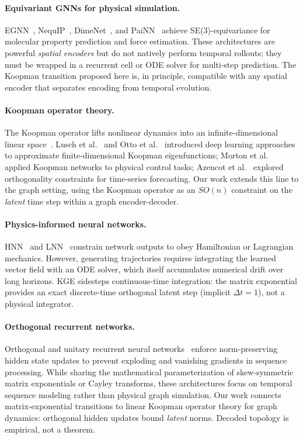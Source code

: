 \documentclass{article}
\newcommand{\GKE}{\textsc{KGE}}
\begin{document}
\paragraph{Equivariant GNNs for physical simulation.}
EGNN~\citep{satorras2021n}, NequIP~\citep{batzner2022nequip}, DimeNet~\citep{klicpera2020directional}, and PaiNN~\citep{schutt2021equivariant} achieve SE(3)-equivariance for molecular property prediction and force estimation.  These architectures are powerful \emph{spatial encoders} but do not natively perform temporal rollouts; they must be wrapped in a recurrent cell or ODE solver for multi-step prediction.  The Koopman transition proposed here is, in principle, compatible with any spatial encoder that separates encoding from temporal evolution.

\paragraph{Koopman operator theory.}
The Koopman operator lifts nonlinear dynamics into an infinite-dimensional linear space~\citep{koopman1931hamiltonian}.  Lusch et al.~\cite{lusch2018deep} and Otto et al.~\cite{otto2019linearly} introduced deep learning approaches to approximate finite-dimensional Koopman eigenfunctions; Morton et al.~\cite{morton2018deep} applied Koopman networks to physical control tasks; Azencot et al.~\cite{azencot2020forecasting} explored orthogonality constraints for time-series forecasting.  Our work extends this line to the graph setting, using the Koopman operator as an $SO(n)$ constraint on the \emph{latent} time step within a graph encoder-decoder.

\paragraph{Physics-informed neural networks.}
HNN~\citep{greydanus2019hamiltonian} and LNN~\citep{cranmer2020lagrangian} constrain network outputs to obey Hamiltonian or Lagrangian mechanics.  However, generating trajectories requires integrating the learned vector field with an ODE solver, which itself accumulates numerical drift over long horizons.  \GKE{} sidesteps continuous-time integration: the matrix exponential provides an exact discrete-time orthogonal latent step (implicit $\Delta t=1$), not a physical integrator.

\paragraph{Orthogonal recurrent networks.}
Orthogonal and unitary recurrent neural networks~\citep{arjovsky2016unitary,helfrich2018orthogonal} enforce norm-preserving hidden state updates to prevent exploding and vanishing gradients in sequence processing. While sharing the mathematical parameterization of skew-symmetric matrix exponentials or Cayley transforms, these architectures focus on temporal sequence modeling rather than physical graph simulation. Our work connects matrix-exponential transitions to linear Koopman operator theory for graph dynamics: orthogonal hidden updates bound \emph{latent} norms. Decoded topology is empirical, not a theorem.
\end{document}
